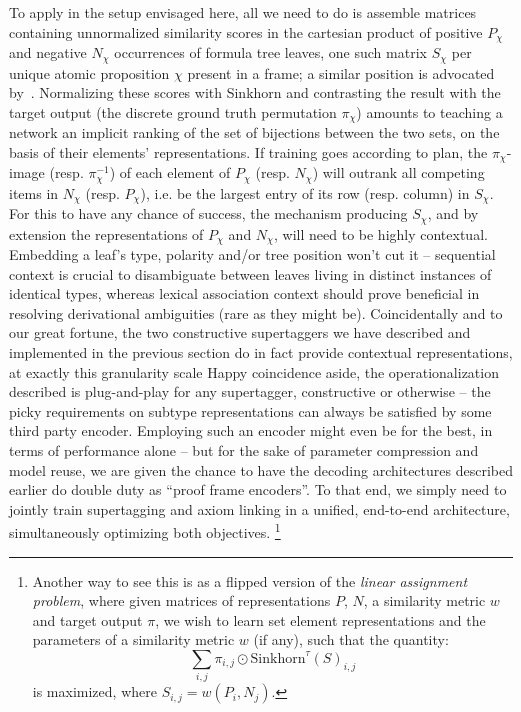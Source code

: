 To apply in the setup envisaged here, all we need to do is assemble matrices containing unnormalized similarity scores in the cartesian product of positive $P_{\chi}$ and negative $N_{\chi}$ occurrences of formula tree leaves, one such matrix $S_{\chi}$ per unique atomic proposition $\chi$ present in a frame; a similar position is advocated by~\citet{moot2008graph}.
Normalizing these scores with Sinkhorn and contrasting the result with the target output (the discrete ground truth permutation $\pi_{\chi}$) amounts to teaching a network an implicit ranking of the set of bijections between the two sets, on the basis of their elements' representations.
If training goes according to plan, the $\pi_{\chi}$-image (resp. $\pi_{\chi}^{-1}$) of each element of $P_{\chi}$ (resp. $N_{\chi}$) will outrank all competing items in $N_{\chi}$ (resp. $P_{\chi}$), i.e. be the largest entry of its row (resp. column) in $S_{\chi}$.
For this to have any chance of success, the mechanism producing $S_{\chi}$, and by extension the representations of $P_{\chi}$ and $N_{\chi}$, will need to be highly contextual.
Embedding a leaf's type, polarity and/or tree position won't cut it -- sequential context is crucial to disambiguate between leaves living in distinct instances of identical types, whereas lexical association context should prove beneficial in resolving derivational ambiguities (rare as they might be).
Coincidentally and to our great fortune, the two constructive supertaggers we have described and implemented in the previous section do in fact provide contextual representations, at exactly this granularity scale
Happy coincidence aside, the operationalization described is plug-and-play for any supertagger, constructive or otherwise -- the picky requirements on subtype representations can always be satisfied by some third party encoder.
Employing such an encoder might even be for the best, in terms of performance alone -- but for the sake of parameter compression and model reuse, we are given the chance to have the decoding architectures described earlier do double duty as ``proof frame encoders''.
To that end, we simply need to jointly train supertagging and axiom linking in a unified, end-to-end architecture, simultaneously optimizing both objectives.%
	\footnote{
	Another way to see this is as a flipped version of the \textit{linear assignment problem}, where given matrices of representations $P$, $N$, a similarity metric $w$ and target output $\pi$, we wish to learn set element representations and the parameters of a similarity metric $w$ (if any), such that the quantity:
	\[
		\sum_{i, j} \pi_{i,j} \odot \mathrm{Sinkhorn}^{\tau}(S)_{i,j}
	\]
	is maximized, where $S_{i,j} = w(P_i, N_j)$.
}

